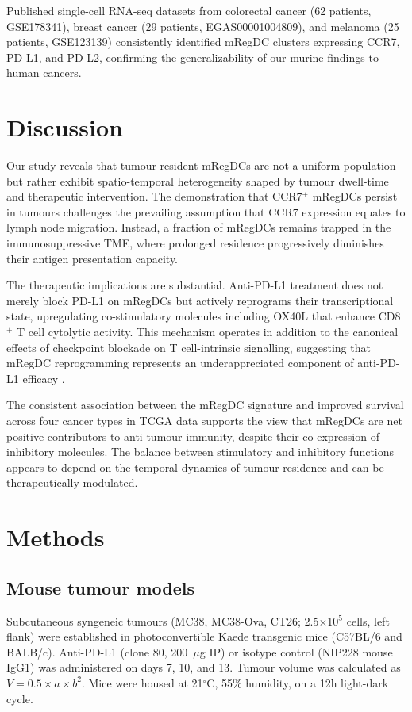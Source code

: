 \documentclass[11pt]{article}
\begin{document}
Published single-cell RNA-seq datasets from colorectal cancer (62 patients, GSE178341), breast cancer (29 patients, EGAS00001004809), and melanoma (25 patients, GSE123139) consistently identified mRegDC clusters expressing CCR7, PD-L1, and PD-L2, confirming the generalizability of our murine findings to human cancers.

\section{Discussion}

Our study reveals that tumour-resident mRegDCs are not a uniform population but rather exhibit spatio-temporal heterogeneity shaped by tumour dwell-time and therapeutic intervention. The demonstration that CCR7$^{+}$ mRegDCs persist in tumours challenges the prevailing assumption that CCR7 expression equates to lymph node migration. Instead, a fraction of mRegDCs remains trapped in the immunosuppressive TME, where prolonged residence progressively diminishes their antigen presentation capacity.

The therapeutic implications are substantial. Anti-PD-L1 treatment does not merely block PD-L1 on mRegDCs but actively reprograms their transcriptional state, upregulating co-stimulatory molecules including OX40L that enhance CD8$^{+}$ T cell cytolytic activity. This mechanism operates in addition to the canonical effects of checkpoint blockade on T cell-intrinsic signalling, suggesting that mRegDC reprogramming represents an underappreciated component of anti-PD-L1 efficacy \citep{garris2018successful}.

The consistent association between the mRegDC signature and improved survival across four cancer types in TCGA data supports the view that mRegDCs are net positive contributors to anti-tumour immunity, despite their co-expression of inhibitory molecules. The balance between stimulatory and inhibitory functions appears to depend on the temporal dynamics of tumour residence and can be therapeutically modulated.

\section{Methods}

\subsection{Mouse tumour models}
Subcutaneous syngeneic tumours (MC38, MC38-Ova, CT26; 2.5$\times$10$^5$ cells, left flank) were established in photoconvertible Kaede transgenic mice (C57BL/6 and BALB/c). Anti-PD-L1 (clone 80, 200~$\mu$g IP) or isotype control (NIP228 mouse IgG1) was administered on days 7, 10, and 13. Tumour volume was calculated as $V = 0.5 \times a \times b^2$. Mice were housed at 21$^\circ$C, 55\% humidity, on a 12h light-dark cycle.
\end{document}
